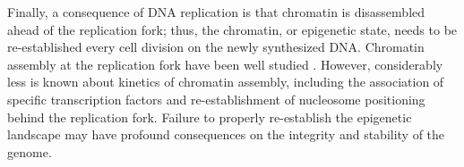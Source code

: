 Finally, a consequence of DNA replication is that chromatin is disassembled ahead of the replication fork; thus, the chromatin, or epigenetic state, needs to be re-established every cell division on the newly synthesized DNA\citep{MacAlpine2013-ds}.  Chromatin assembly at the replication fork have been well studied \invitro. However, considerably less is known about \invivo kinetics of chromatin assembly, including the association of specific transcription factors and re-establishment of nucleosome positioning behind the replication fork. Failure to properly re-establish the epigenetic landscape may have profound consequences on the integrity and stability of the genome.






















